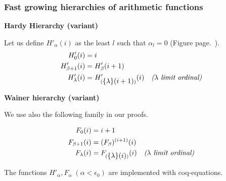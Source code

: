 \documentclass[10pt, fleqn]{beamer}
\begin{document}
\begin{frame}
  \frametitle{Fast growing hierarchies of arithmetic functions}




\begin{block}{}
 
  {\small
\textbf{Hardy Hierarchy (variant)}
    
 Let us define \textcolor{mathcolor}{$H'_\alpha(i)$} as the least $l$ such that \textcolor{mathcolor}{$\alpha_l=0$} (Figure page.~\pageref{fig:accessibility}). 
 {\color{mathcolor}
\begin{align}
  H'_0(i) & = i\\
  H'_{\beta+1}(i) &=H'_\beta(i+1) \\
  H'_\lambda(i) &= H'_{(\mbox{$\{\lambda\}(i+1)$})}(i)  \quad\textit{($\lambda$ limit ordinal)} 
\end{align}}
 

\vspace{4pt}

\textbf{Wainer hierarchy (variant)}


We use also the following family in our proofs.

{\color{mathcolor}
\begin{align}
F_0(i)& =i+1\\
F_{\beta+1}(i)&= (F_\beta)^{(i+1)}(i)\\
F_\lambda(i) &= F_{(\mbox{$\{\lambda\}(i)$})} (i) \quad \textit{($\lambda$ limit ordinal)}
\end{align}}}
\end{block}
\end{frame}



\begin{frame}[fragile]
 
      \begin{block}{}
    The functions \textcolor{mathcolor}{$H'_\alpha, F_\alpha\;(\alpha< \epsilon_0)$} are implemented with \textcolor{plugincolor}{coq-equations}.
    \vspace{5pt}
    \begin{footnotesize}
    \end{footnotesize}

 
  \end{block}

\end{frame}
\end{document}
